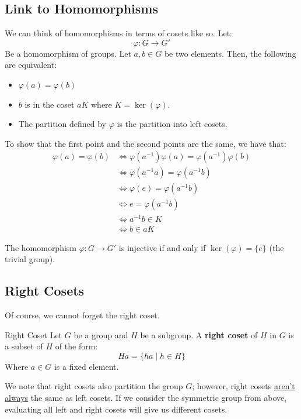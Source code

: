 \documentclass[letterpaper]{article}
\begin{document}
\subsection{Link to Homomorphisms}
We can think of homomorphisms in terms of cosets like so. Let: 
\[\varphi: G \to G'\]
Be a homomorphism of groups. Let $a, b \in G$ be two elements. Then, the following are equivalent: 
\begin{itemize}
    \item $\varphi(a) = \varphi(b)$
    \item $b$ is in the coset $aK$ where $K = \ker(\varphi)$. 
    \item The partition defined by $\varphi$ is the partition into left cosets. 
\end{itemize}
To show that the first point and the second points are the same, we have that: 
\begin{equation*}
    \begin{aligned}
        \varphi(a) = \varphi(b) &\iff \varphi(a^{-1}) \varphi(a) = \varphi(a^{-1}) \varphi(b) \\ 
            &\iff \varphi(a^{-1}a) = \varphi(a^{-1}b) \\ 
            &\iff \varphi(e) = \varphi(a^{-1} b) \\ 
            &\iff e = \varphi(a^{-1} b) \\ 
            &\iff a^{-1} b \in K \\ 
            &\iff b \in aK 
    \end{aligned}
\end{equation*}

\begin{corollary}{}{}
    The homomorphism $\varphi: G \to G'$ is injective if and only if $\ker(\varphi) = \{e\}$ (the trivial group). 
\end{corollary}


\subsection{Right Cosets}
Of course, we cannot forget the right coset. 
\begin{definition}{Right Coset}{}
    Let $G$ be a group and $H$ be a subgroup. A \textbf{right coset} of $H$ in $G$ is a subset of $H$ of the form:  
    \[Ha = \{ha \mid h \in H\}\]
    Where $a \in G$ is a fixed element. 
\end{definition}

We note that right cosets also partition the group $G$; however, right cosets \underline{aren't always} the same as left cosets. If we consider the symmetric group from above, evaluating all left and right cosets will give us different cosets. 
\end{document}
